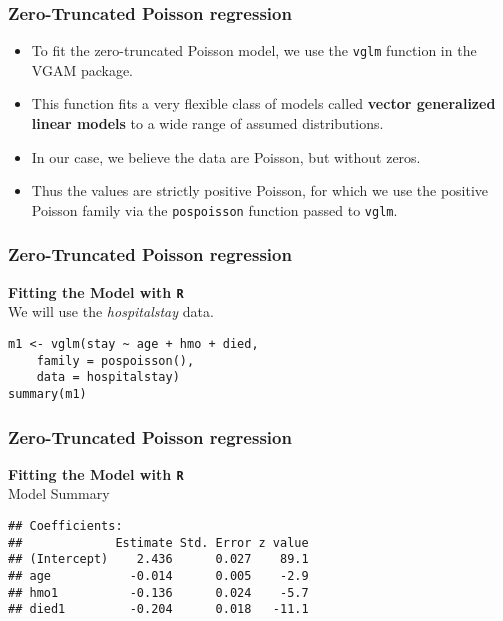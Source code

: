 \documentclass[MASTER.tex]{subfiles}
\begin{document}
\begin{frame}[fragile]
	\frametitle{Zero-Truncated Poisson regression}
\large
\begin{itemize}
\item To fit the zero-truncated Poisson model, we use the \texttt{vglm} function in the VGAM package. 
\item This function fits a very flexible class of models called \textbf{vector generalized linear models} to a wide range of assumed distributions. 
\item In our case, we believe the data are Poisson, but without zeros. 
\item Thus the values are strictly positive Poisson, for which we use the positive Poisson family via the \texttt{pospoisson} function passed to \texttt{vglm}.
\end{itemize}
\end{frame}
\begin{frame}[fragile]
	\frametitle{Zero-Truncated Poisson regression}
\Large
\textbf{Fitting the Model with \texttt{R}}\\
We will use the \textit{hospitalstay} data.
\begin{framed}
\begin{verbatim}
m1 <- vglm(stay ~ age + hmo + died, 
    family = pospoisson(), 
    data = hospitalstay)
summary(m1)
\end{verbatim}
\end{framed}
\end{frame}


\begin{frame}[fragile]
	\frametitle{Zero-Truncated Poisson regression}
	\large
	\textbf{Fitting the Model with \texttt{R}}\\
	Model Summary
	\begin{verbatim}
## Coefficients:
##             Estimate Std. Error z value
## (Intercept)    2.436      0.027    89.1
## age           -0.014      0.005    -2.9
## hmo1          -0.136      0.024    -5.7
## died1         -0.204      0.018   -11.1
	\end{verbatim}
\end{frame}
\end{document}
